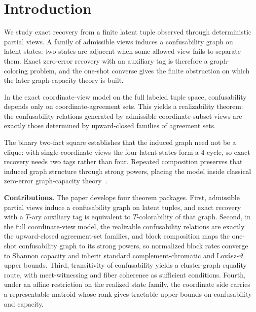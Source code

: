 \section{Introduction}\label{introduction}

We study exact recovery from a finite latent tuple observed through deterministic partial views. A family of admissible views induces a confusability graph on latent states: two states are adjacent when some allowed view fails to separate them. Exact zero-error recovery with an auxiliary tag is therefore a graph-coloring problem, and the one-shot converse gives the finite obstruction on which the later graph-capacity theory is built.

In the exact coordinate-view model on the full labeled tuple space, confusability depends only on coordinate-agreement sets. This yields a realizability theorem: the confusability relations generated by admissible coordinate-subset views are exactly those determined by upward-closed families of agreement sets.

The binary two-fact square establishes that the induced graph need not be a clique: with single-coordinate views the four latent states form a $4$-cycle, so exact recovery needs two tags rather than four. Repeated composition preserves that induced graph structure through strong powers, placing the model inside classical zero-error graph-capacity theory~\cite{shannon1956zero,korner1973graphs,lovasz1979shannon,korner2002zero,witsenhausen1976zero,slepian1973noiseless,cover2006elements,alon2002source}.

\medskip
\noindent\textbf{Contributions.} The paper develops four theorem packages. First, admissible partial views induce a confusability graph on latent tuples, and exact recovery with a $T$-ary auxiliary tag is equivalent to $T$-colorability of that graph. Second, in the full coordinate-view model, the realizable confusability relations are exactly the upward-closed agreement-set families, and block composition maps the one-shot confusability graph to its strong powers, so normalized block rates converge to Shannon capacity and inherit standard complement-chromatic and Lov\'asz-$\vartheta$ upper bounds. Third, transitivity of confusability yields a cluster-graph equality route, with meet-witnessing and fiber coherence as sufficient conditions. Fourth, under an affine restriction on the realized state family, the coordinate side carries a representable matroid whose rank gives tractable upper bounds on confusability and capacity.

